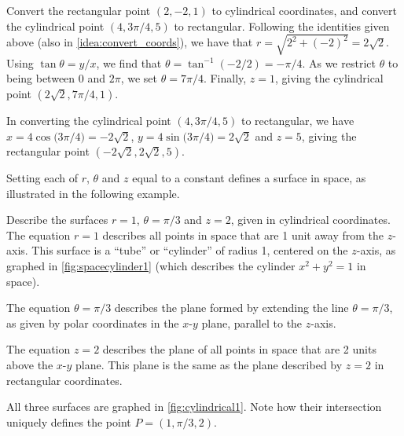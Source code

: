 

\begin{example}\label{ex_cylindrical4}
Convert the rectangular point $(2,-2,1)$ to cylindrical coordinates, and convert the cylindrical point $(4,3\pi/4,5)$ to rectangular.
\solution
Following the identities given above (also in \autoref{idea:convert_coords}), we have that $r = \sqrt{2^2+(-2)^2} = 2\sqrt{2}$. Using $\tan\theta = y/x$, we find that $\theta = \tan^{-1}(-2/2) =-\pi/4$. As we restrict $\theta$ to being between $0$ and $2\pi$, we set $\theta = 7\pi/4$. Finally, $z = 1$, giving the cylindrical point $(2\sqrt2,7\pi/4,1)$.

In converting the cylindrical point $(4,3\pi/4,5)$ to rectangular, we have
$x = 4\cos\bigl(3\pi/4\bigr) = -2\sqrt{2}$, $y = 4\sin\bigl(3\pi/4\bigr) = 2\sqrt{2}$ and $z=5$, giving the rectangular point $(-2\sqrt{2},2\sqrt{2},5)$.
\end{example}

Setting each of $r$, $\theta$ and $z$ equal to a constant defines a surface in space, as illustrated in the following example.


\begin{example}\label{ex_cylindrical1}
Describe the surfaces $r=1$, $\theta = \pi/3$ and $z=2$, given in cylindrical coordinates.
\solution
The equation $r=1$ describes all points in space that are 1 unit away from the $z$-axis. This surface is a ``tube'' or ``cylinder'' of radius 1, centered on the $z$-axis, as graphed in \autoref{fig:spacecylinder1} (which describes the cylinder $x^2+y^2=1$ in space). 

The equation $\theta=\pi/3$ describes the plane formed by extending the line $\theta=\pi/3$, as given by polar coordinates in the $x$-$y$ plane, parallel to the $z$-axis.

The equation $z=2$ describes the plane of all points in space that are 2 units above the $x$-$y$ plane. This plane is the same as the plane described by $z=2$ in rectangular coordinates.

All three surfaces are graphed in \autoref{fig:cylindrical1}. Note how their intersection uniquely defines the point $P=(1,\pi/3,2)$.
\end{example}

